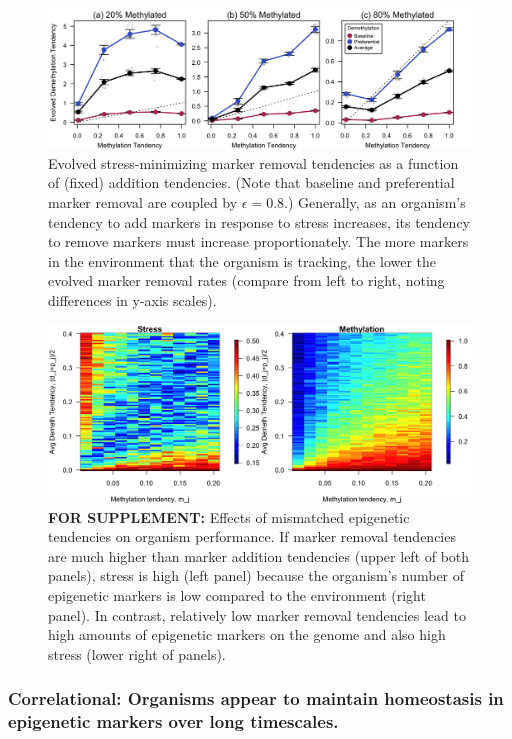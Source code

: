 \documentclass{article}
\begin{document}
\begin{figure}
    \centering
    \includegraphics[width= \textwidth]{Figures/Fig_EvolutionSimulation_3cases.png}
    \caption{Evolved stress-minimizing marker removal tendencies as a function of (fixed) addition tendencies. (Note that baseline and preferential marker removal are coupled by $\epsilon = 0.8$.) Generally, as an organism's tendency to add markers in response to stress increases, its tendency to remove markers must increase proportionately. The more markers in the environment that the organism is tracking, the lower the evolved marker removal rates (compare from left to right, noting differences in y-axis scales).}
    \label{Fig:Evolution3panel}
\end{figure}

\begin{figure}
    \centering
    \includegraphics[width= \textwidth]{Figures/Fig_Heatmap_v2.png}
    \caption{\textbf{FOR SUPPLEMENT:} Effects of mismatched epigenetic tendencies on organism performance. If marker removal tendencies are much higher than marker addition tendencies (upper left of both panels), stress is high (left panel) because the organism's number of epigenetic markers is low compared to the environment (right panel). In contrast, relatively low marker removal tendencies lead to high amounts of epigenetic markers on the genome and also high stress (lower right of panels).  }
    \label{SFig:StressHeatmap}
\end{figure}


\subsubsection{Correlational: Organisms appear to maintain homeostasis in epigenetic markers over long timescales.}
\end{document}
